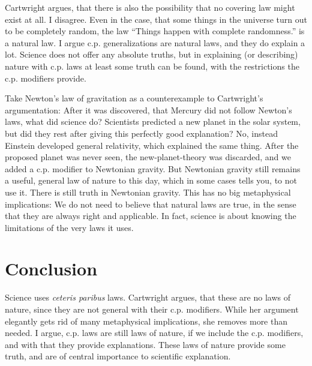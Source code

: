 Cartwright argues, that there is also the possibility that
no covering law might exist at all.
I disagree. Even in the case, that some things in the universe turn out to be
completely random, the law \enquote{Things happen with complete randomness.}
is a natural law.
I argue c.p. generalizations are natural laws, and they do explain a lot.
Science does not offer any absolute truths, but
in explaining (or describing) nature with c.p. laws at least
some truth can be found, with the restrictions the c.p. modifiers provide.

Take Newton's law of gravitation as a counterexample to Cartwright's argumentation:
After it was discovered, that Mercury did not follow Newton's laws, what did
science do?
Scientists predicted a new planet in the solar system, but
did they rest after giving this perfectly good explanation?
No, instead Einstein developed general relativity, which explained the same thing.
After the proposed planet was never seen, the new-planet-theory was discarded, and
we added a c.p. modifier to Newtonian gravity.
But Newtonian gravity still remains a useful, general law of nature to this day,
which in some cases tells you, to not use it.
There is still truth in Newtonian gravity.
This has no big metaphysical implications:
We do not need to believe that natural laws are true,
in the sense that they are always right and applicable.
In fact, science is about knowing the limitations of the
very laws it uses.

\section*{Conclusion}
Science uses \emph{ceteris paribus} laws.
Cartwright argues, that these are no laws of nature,
since they are not general with their c.p. modifiers.
While her argument elegantly gets rid of many
metaphysical implications, she removes more
than needed.
I argue, c.p. laws are still laws of nature, if we include the
c.p. modifiers, and with that they provide explanations.
These laws of nature provide some truth,
and are of central importance to scientific
explanation.